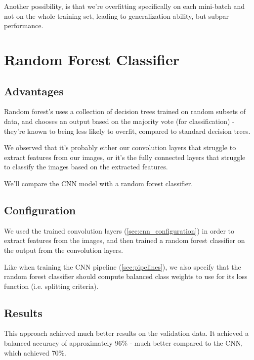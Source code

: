 \documentclass[12pt,a4paper,english]{article}
\begin{document}
    Another possibility, is that we're overfitting specifically on each mini-batch and not on the whole training set,
    leading to generalization ability, but subpar performance.

    \newpage
    \section{Random Forest Classifier}

    \subsection{Advantages}

    Random forest's uses a collection of decision trees trained on random subsets of data,
    and chooses an output based on the majority vote (for classification) - they're known to being less likely
    to overfit, compared to standard decision trees.

    We observed that it's probably either our convolution layers that struggle to extract features from our images, or it's
    the fully connected layers that struggle to classify the images based on the extracted features.

    We'll compare the CNN model with a random forest classifier.

    \cite{enwiki:1350010429}

    \subsection{Configuration}

    We used the trained convolution layers (\ref{sec:cnn_configuration}) in order to extract features from the images,
    and then trained a random forest classifier on the output from the convolution layers.

    Like when training the CNN pipeline (\ref{sec:pipelines}), we also specify that the random forest classifier should compute balanced class weights
    to use for its loss function (i.e. splitting criteria).

    \subsection{Results}

    This approach achieved much better results on the validation data.
    It achieved a balanced accuracy of approximately 96\% - much better compared to the CNN, which achieved 70\%.
\end{document}
